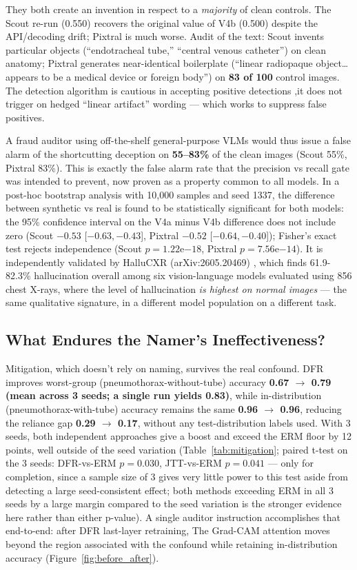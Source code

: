 \documentclass{ieeeaccess}
\begin{document}
They both create an invention in respect to a \emph{majority} of clean controls. The Scout re-run (0.550) recovers the original value of V4b (0.500) despite the API/decoding drift; Pixtral is much worse. Audit of the text: Scout invents particular objects (``endotracheal tube,'' ``central venous catheter'') on clean anatomy; Pixtral generates near-identical boilerplate (``linear radiopaque object\ldots appears to be a medical device or foreign body'') on \textbf{83 of 100} control images. The detection algorithm is cautious in accepting positive detections ,it does not trigger on hedged ``linear artifact'' wording --- which works to suppress false positives.

A fraud auditor using off-the-shelf general-purpose VLMs would thus issue a false alarm of the shortcutting deception on \textbf{55--83\%} of the clean images (Scout 55\%, Pixtral 83\%). This is exactly the false alarm rate that the precision vs recall gate was intended to prevent, now proven as a property common to all models. In a post-hoc bootstrap analysis with 10,000 samples and seed 1337, the difference between synthetic vs real is found to be statistically significant for both models: the 95\% confidence interval on the V4a minus V4b difference does not include zero (Scout $-0.53$ [$-0.63, -0.43$], Pixtral $-0.52$ [$-0.64, -0.40$]); Fisher's exact test rejects independence (Scout $p = 1.22\mathrm{e}{-18}$, Pixtral $p = 7.56\mathrm{e}{-14}$). It is independently validated by HalluCXR (arXiv:2605.20469) \cite{hallucxr}, which finds 61.9-82.3\% hallucination overall among six vision-language models evaluated using 856 chest X-rays, where the level of hallucination \emph{is highest on normal images} --- the same qualitative signature, in a different model population on a different task.

\subsection{What Endures the Namer's Ineffectiveness?}
Mitigation, which doesn't rely on naming, survives the real confound. DFR improves worst-group (pneumothorax-without-tube) accuracy \textbf{0.67 $\rightarrow$ 0.79 (mean across 3 seeds; a single run yields 0.83)}, while in-distribution (pneumothorax-with-tube) accuracy remains the same \textbf{0.96 $\rightarrow$ 0.96}, reducing the reliance gap \textbf{0.29 $\rightarrow$ 0.17}, without any test-distribution labels used. With 3 seeds, both independent approaches give a boost and exceed the ERM floor by 12 points, well outside of the seed variation (Table~\ref{tab:mitigation}; paired t-test on the 3 seeds: DFR-vs-ERM $p=0.030$, JTT-vs-ERM $p=0.041$ --- only for completion, since a sample size of 3 gives very little power to this test aside from detecting a large seed-consistent effect; both methods exceeding ERM in all 3 seeds by a large margin compared to the seed variation is the stronger evidence here rather than either p-value). A single auditor instruction accomplishes that end-to-end: after DFR last-layer retraining, The Grad-CAM attention moves beyond the region associated with the confound while retaining in-distribution accuracy (Figure~\ref{fig:before_after}).
\end{document}
